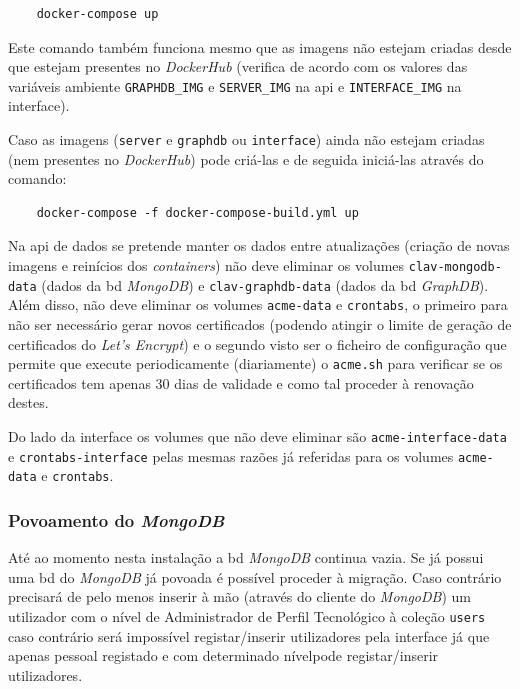 \footnotesize
\begin{verbatim}
    docker-compose up
\end{verbatim}
\normalsize

Este comando também funciona mesmo que as imagens não estejam criadas desde que estejam presentes no \textit{DockerHub} (verifica de acordo com os valores das variáveis ambiente \texttt{GRAPHDB\_IMG} e \texttt{SERVER\_IMG} na \acrshort{api} e \texttt{INTERFACE\_IMG} na interface).

Caso as imagens (\texttt{server} e \texttt{graphdb} ou \texttt{interface}) ainda não estejam criadas (nem presentes no \textit{DockerHub}) pode criá-las e de seguida iniciá-las através do comando:

\footnotesize
\begin{verbatim}
    docker-compose -f docker-compose-build.yml up
\end{verbatim}
\normalsize

Na \acrshort{api} de dados se pretende manter os dados entre atualizações (criação de novas imagens e reinícios dos \textit{containers}) não deve eliminar os volumes \texttt{clav-mongodb-data} (dados da \acrshort{bd} \textit{MongoDB}) e \texttt{clav-graphdb-data} (dados da \acrshort{bd} \textit{GraphDB}). Além disso, não deve eliminar os volumes \texttt{acme-data} e \texttt{crontabs}, o primeiro para não ser necessário gerar novos certificados (podendo atingir o limite de geração de certificados do \textit{Let's Encrypt}) e o segundo visto ser o ficheiro de configuração que permite que execute periodicamente (diariamente) o \texttt{acme.sh} para verificar se os certificados tem apenas 30 dias de validade e como tal proceder à renovação destes.

Do lado da interface os volumes que não deve eliminar são \texttt{acme-interface-data} e \texttt{crontabs-interface} pelas mesmas razões já referidas para os volumes \texttt{acme-data} e \texttt{crontabs}. 

\subsubsection{Povoamento do \textit{MongoDB}}\label{sec:inst-povMDB}
Até ao momento nesta instalação a \acrshort{bd} \textit{MongoDB} continua vazia. Se já possui uma \acrshort{bd} do \textit{MongoDB} já povoada é possível proceder à migração. Caso contrário precisará de pelo menos inserir à mão (através do cliente do \textit{MongoDB}) um utilizador com o nível de Administrador de Perfil Tecnológico à coleção \texttt{users} caso contrário será impossível registar/inserir utilizadores pela interface já que apenas pessoal registado e com determinado nívelpode registar/inserir utilizadores.

